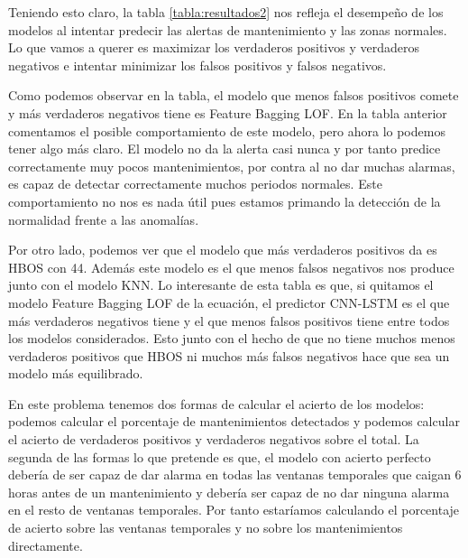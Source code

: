 Teniendo esto claro, la tabla \ref{tabla:resultados2} nos refleja el desempeño de los modelos al intentar predecir las alertas de mantenimiento y las zonas normales. Lo que vamos a querer es maximizar los verdaderos positivos y verdaderos negativos e intentar minimizar los falsos positivos y falsos negativos.

Como podemos observar en la tabla, el modelo que menos falsos positivos comete y más verdaderos negativos tiene es Feature Bagging LOF. En la tabla anterior comentamos el posible comportamiento de este modelo, pero ahora lo podemos tener algo más claro. El modelo no da la alerta casi nunca y por tanto predice correctamente muy pocos mantenimientos, por contra al no dar muchas alarmas, es capaz de detectar correctamente muchos periodos normales. Este comportamiento no nos es nada útil pues estamos primando la detección de la normalidad frente a las anomalías.

Por otro lado, podemos ver que el modelo que más verdaderos positivos da es HBOS con 44. Además este modelo es el que menos falsos negativos nos produce junto con el modelo KNN. Lo interesante de esta tabla es que, si quitamos el modelo Feature Bagging LOF de la ecuación, el predictor CNN-LSTM es el que más verdaderos negativos tiene y el que menos falsos positivos tiene entre todos los modelos considerados. Esto junto con el hecho de que no tiene muchos menos verdaderos positivos que HBOS ni muchos más falsos negativos hace que sea un modelo más equilibrado.

En este problema tenemos dos formas de calcular el acierto de los modelos: podemos calcular el porcentaje de mantenimientos detectados y podemos calcular el acierto de verdaderos positivos y verdaderos negativos sobre el total. La segunda de las formas lo que pretende es que, el modelo con acierto perfecto debería de ser capaz de dar alarma en todas las ventanas temporales que caigan 6 horas antes de un mantenimiento y debería ser capaz de no dar ninguna alarma en el resto de ventanas temporales. Por tanto estaríamos calculando el porcentaje de acierto sobre las ventanas temporales y no sobre los mantenimientos directamente.

\begin{table}[H]
	\centering
	\begin{tabular}
	\end{tabular}
	\caption{Tabla con los aciertos de los modelos.}
	\label{tabla:resultados3}
\end{table}

